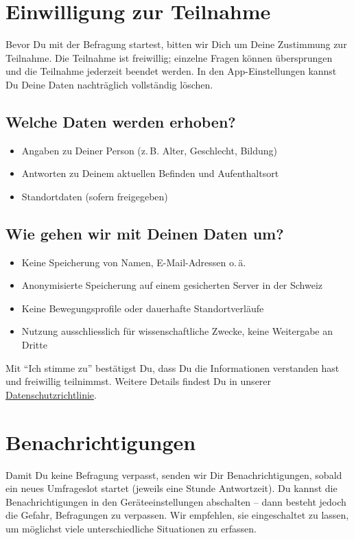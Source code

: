 \begin{appendices}
\hrulefill

\section*{Einwilligung zur Teilnahme}
Bevor Du mit der Befragung startest, bitten wir Dich um Deine Zustimmung zur Teilnahme.  
Die Teilnahme ist freiwillig; einzelne Fragen können übersprungen und die Teilnahme jederzeit beendet werden. In den App-Einstellungen kannst Du Deine Daten nachträglich vollständig löschen.

\subsection*{Welche Daten werden erhoben?}
\begin{itemize}\setlength{\itemsep}{0pt}
  \item Angaben zu Deiner Person (z.\,B. Alter, Geschlecht, Bildung)
  \item Antworten zu Deinem aktuellen Befinden und Aufenthaltsort
  \item Standortdaten (sofern freigegeben)
\end{itemize}

\subsection*{Wie gehen wir mit Deinen Daten um?}
\begin{itemize}\setlength{\itemsep}{0pt}
  \item Keine Speicherung von Namen, E-Mail-Adressen o.\,ä.
  \item Anonymisierte Speicherung auf einem gesicherten Server in der Schweiz
  \item Keine Bewegungsprofile oder dauerhafte Standortverläufe
  \item Nutzung ausschliesslich für wissenschaftliche Zwecke, keine Weitergabe an Dritte
\end{itemize}

Mit \enquote{Ich stimme zu} bestätigst Du, dass Du die Informationen verstanden hast und freiwillig teilnimmst. Weitere Details findest Du in unserer \href{https://intermind.ch/privacy-policy.html}{Datenschutzrichtlinie}.

\hrulefill

\section*{Benachrichtigungen}
Damit Du keine Befragung verpasst, senden wir Dir Benachrichtigungen, sobald ein neues Umfrageslot startet (jeweils eine Stunde Antwortzeit).  
Du kannst die Benachrichtigungen in den Geräteeinstellungen abschalten – dann besteht jedoch die Gefahr, Befragungen zu verpassen.  
Wir empfehlen, sie eingeschaltet zu lassen, um möglichst viele unterschiedliche Situationen zu erfassen.


\end{appendices}

